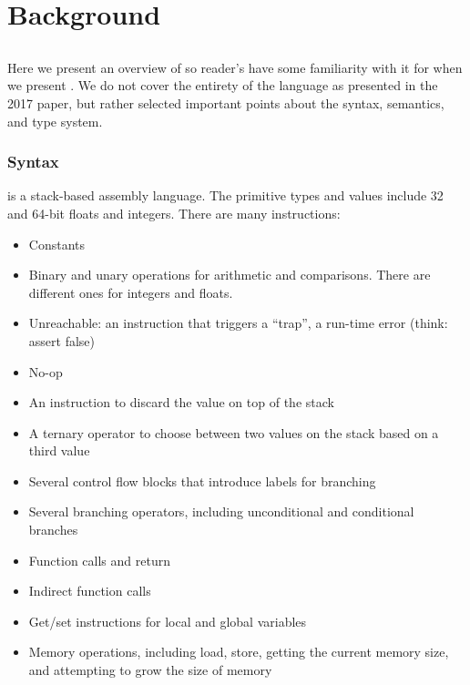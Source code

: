 \chapter{Background}
\section{\wasm}
\label{sec:wasm}
Here we present an overview of \wasm so reader's have some familiarity with it for when we present \name.
We do not cover the entirety of the \wasm language as presented in the 2017 paper, but rather selected important points about the syntax, semantics, and type system.

\subsection{\wasm Syntax}
\wasm is a stack-based assembly language.
The primitive \wasm types and values include 32 and 64-bit floats and integers.
There are many instructions:
\begin{itemize}
    \item Constants
    \item Binary and unary operations for arithmetic and comparisons. There are different ones for integers and floats.
    \item Unreachable: an instruction that triggers a ``trap'', a \wasm run-time error (think: assert false)
    \item No-op
    \item An instruction to discard the value on top of the stack
    \item A ternary operator to choose between two values on the stack based on a third value
    \item Several control flow blocks that introduce labels for branching
    \item Several branching operators, including unconditional and conditional branches
    \item Function calls and return
    \item Indirect function calls
    \item Get/set instructions for local and global variables
    \item Memory operations, including load, store, getting the current memory size, and attempting to grow the size of memory
\end{itemize}

